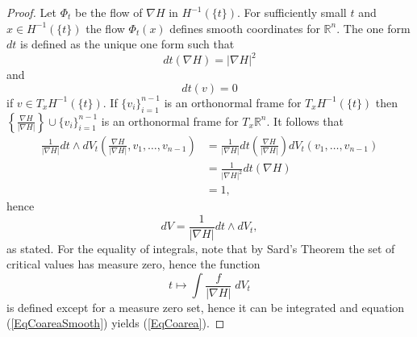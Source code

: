 \documentclass[10pt,a4paper]{amsart}
\begin{document}
\begin{proof}
Let $\Phi_{t}$ be the flow of $\nabla H$ in $H^{-1}(\{t\})$. For sufficiently small $t$ and $x\in H^{-1}(\{t\})$ the flow $\Phi_{t}(x)$ defines smooth coordinates for $\mathbb{R}^{n}$. The one form $dt$ is defined as the unique one form such that
\begin{equation*}
    dt(\nabla H) = |\nabla H|^{2}
\end{equation*}
and
\begin{equation*}
    dt(v) = 0
\end{equation*}
if $v\in T_{x}H^{-1}(\{t\})$. If $\{v_{i}\}_{i=1}^{n-1}$ is an orthonormal frame for $T_{x}H^{-1}(\{t\})$ then $\left\{\frac{\nabla H}{|\nabla H|}\right\}\cup \{v_{i}\}_{i=1}^{n-1}$ is an orthonormal frame for $T_{x}\mathbb{R}^{n}$. It follows that
\begin{align*}
    \frac{1}{|\nabla H|} dt\wedge dV_{t} \left(\frac{\nabla H}{|\nabla H|},v_{1},\ldots,v_{n-1}\right) &= \frac{1}{|\nabla H|}dt\left(\frac{\nabla H}{|\nabla H|}\right) dV_{t} (v_{1},\ldots,v_{n-1})\\
    &= \frac{1}{|\nabla H|^{2}}dt(\nabla H)\\
    &= 1,
\end{align*}
hence
\begin{equation}\label{EqCoareaSmooth}
    dV = \frac{1}{|\nabla H|} dt\wedge dV_{t},
\end{equation}
as stated. For the equality of integrals, note that by Sard's Theorem the set of critical values has measure zero, hence the function
\begin{equation*}
    t \longmapsto \int \frac{f}{|\nabla H|}\;dV_{t}
\end{equation*}
is defined except for a measure zero set, hence it can be integrated and equation (\ref{EqCoareaSmooth}) yields (\ref{EqCoarea}).
\end{proof}
\end{document}
